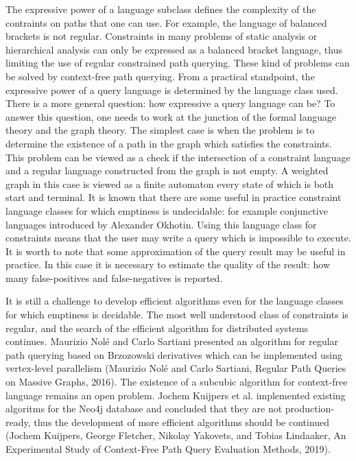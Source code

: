 \documentclass[12pt]{article}  %
\theoremstyle{remark}
\begin{document}
The expressive power of a language subclass defines the complexity of the contraints on paths that one can use. For example, the language of balanced brackets is not regular. Constraints in many problems of static analysis or hierarchical analysis can only be expressed as a balanced bracket language, thus limiting the use of regular constrained path querying. These kind of problems can be solved by context-free path querying. From a practical standpoint, the expressive power of a query language is determined by the language class used. There is a more general question: how expressive a query language can be? To answer this question, one needs to work at the junction of the formal language theory and the graph theory. The simplest case is when the problem is to determine the existence of a path in the graph which satisfies the constraints. This problem can be viewed as a check if the intersection of a constraint language and a regular language constructed from the graph is not empty. A weighted graph in this case is viewed as a finite automaton every state of which is both start and terminal. It is known that there are some useful in practice constraint language classes for which emptiness is undecidable: for example conjunctive languages introduced by Alexander Okhotin. Using this language class for constraints means that the user may write a query which is impossible to execute. It is worth to note that some approximation of the query result may be useful in practice. In this case it is necessary to estimate the quality of the result: how many false-positives and false-negatives is reported.

It is still a challenge to develop efficient algorithms even for the language classes for which emptiness is decidable. The most well understood class of constraints is regular, and the search of the efficient algorithm for distributed systems continues. Maurizio Nolé and Carlo Sartiani presented an algorithm for regular path querying based on Brzozowski derivatives which can be implemented using vertex-level parallelism (Maurizio Nolé and Carlo Sartiani, Regular Path Queries on Massive Graphs, 2016). The existence of a subcubic algorithm for context-free language remains an open problem. Jochem Kuijpers et al. implemented existing algoritms for the Neo4j database and concluded that they are not production-ready, thus the development of more efficient algorithms should be continued (Jochem Kuijpers, George Fletcher, Nikolay Yakovets, and Tobias Lindaaker, An Experimental Study of Context-Free Path Query Evaluation Methods,  2019).
\end{document}
